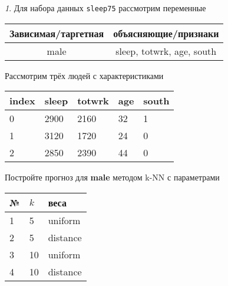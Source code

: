 \documentclass[12pt]{article}
\theoremstyle{remark}
\newtheorem{exercise}{}[section]
\begin{document}
\begin{exercise}
Для набора данных \texttt{sleep75} рассмотрим переменные
\begin{center}
	\begin{tabular}{|c|c|} \hline
		Зависимая/таргетная & объясняющие/признаки \\ \hline
		male & sleep, totwrk, age, south \\ \hline
	\end{tabular}
\end{center}
Рассмотрим трёх людей с характеристиками
\begin{center}
	\begin{tabular}{|l||l|l|l|l|}\hline
		index & sleep & totwrk & age & south  \\ \hline\hline
		0 & 2900 & 2160 & 32 & 1  \\
		1 & 3120 & 1720 & 24 & 0  \\
		2 & 2850 & 2390 & 44 & 0  \\ \hline
	\end{tabular}
\end{center}
Постройте прогноз для \textbf{male} методом k-NN с параметрами
\begin{center}
	\begin{tabular}{|l|l|l|}\hline
	№ & \(k\) & веса \\ \hline
	1 & 5 & uniform \\
	2 & 5 & distance \\
	3 & 10 & uniform \\
	4 & 10 & distance \\ \hline
	\end{tabular}
\end{center}
\end{exercise}
\end{document}
